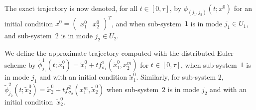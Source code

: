The exact trajectory is now denoted, for all $t \in [0,\tau]$, by
$\phi_{(j_1,j_2)}(t;x^0)$ for an initial condition $x^0
= \begin{pmatrix}x_1^0 & x_2^0\end{pmatrix}^T$, and when
sub-system~$1$ is in mode $j_1 \in U_1$, and sub-system~$2$ is in mode
$j_2 \in U_2$.

We define the approximate trajectory computed with the distributed
Euler scheme by $\tilde{\phi}_{j_ 1}^1(t;\tilde{x}_1^0) = \tilde x_1^0
+ t f_{\sigma_1}^1(\tilde x_1^0,x_2^m)$ for $t \in [0,\tau]$, when
sub-system~$1$ is in mode $j_1$ and with an initial condition $\tilde
x_1^0$. Similarly, for sub-system 2, $\tilde{\phi}_{j_
  2}^2(t;\tilde{x}_2^0) = \tilde x_2^0 + t f_{\sigma_2}^2(x_1^m,\tilde
x_2^0)$ when sub-system~$2$ is in mode $j_2$ and with an initial
condition~$\tilde x_2^0$.

